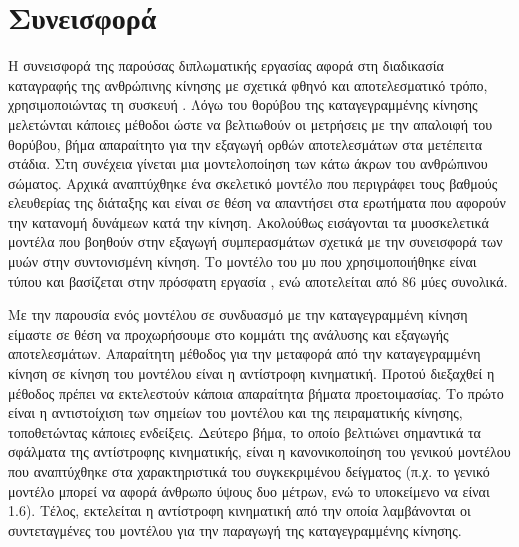 \section{Συνεισφορά}

Η συνεισφορά της παρούσας διπλωματικής εργασίας αφορά στη διαδικασία καταγραφής της ανθρώπινης κίνησης με σχετικά φθηνό και αποτελεσματικό τρόπο, χρησιμοποιώντας τη συσκευή . Λόγω του θορύβου της καταγεγραμμένης κίνησης μελετώνται κάποιες μέθοδοι ώστε να βελτιωθούν οι μετρήσεις με την απαλοιφή του θορύβου, βήμα απαραίτητο για την εξαγωγή ορθών αποτελεσμάτων στα μετέπειτα στάδια. Στη συνέχεια γίνεται μια μοντελοποίηση των κάτω άκρων του ανθρώπινου σώματος. Αρχικά αναπτύχθηκε ένα σκελετικό μοντέλο που περιγράφει τους βαθμούς ελευθερίας της διάταξης και είναι σε θέση να απαντήσει στα ερωτήματα που αφορούν την κατανομή δυνάμεων κατά την κίνηση. Ακολούθως εισάγονται τα μυοσκελετικά μοντέλα που βοηθούν στην εξαγωγή συμπερασμάτων σχετικά με την συνεισφορά των μυών στην συντονισμένη κίνηση. Το μοντέλο του μυ που χρησιμοποιήθηκε είναι τύπου  και βασίζεται στην πρόσφατη εργασία \cite{millard13}, ενώ αποτελείται από 86 μύες συνολικά.

Με την παρουσία ενός μοντέλου σε συνδυασμό με την καταγεγραμμένη κίνηση είμαστε σε θέση να προχωρήσουμε στο κομμάτι της ανάλυσης και εξαγωγής αποτελεσμάτων. Απαραίτητη μέθοδος για την μεταφορά από την καταγεγραμμένη κίνηση σε κίνηση του μοντέλου είναι η αντίστροφη κινηματική. Προτού διεξαχθεί η μέθοδος πρέπει να εκτελεστούν κάποια απαραίτητα βήματα προετοιμασίας. Το πρώτο είναι η αντιστοίχιση των σημείων του μοντέλου και της πειραματικής κίνησης, τοποθετώντας κάποιες ενδείξεις. Δεύτερο βήμα, το οποίο βελτιώνει σημαντικά τα σφάλματα της αντίστροφης κινηματικής, είναι η κανονικοποίηση του γενικού μοντέλου που αναπτύχθηκε στα χαρακτηριστικά του συγκεκριμένου δείγματος (π.χ. το γενικό μοντέλο μπορεί να αφορά άνθρωπο ύψους δυο μέτρων, ενώ το υποκείμενο να είναι 1.6). Τέλος, εκτελείται η αντίστροφη κινηματική από την οποία λαμβάνονται οι συντεταγμένες του μοντέλου για την παραγωγή της καταγεγραμμένης κίνησης.

